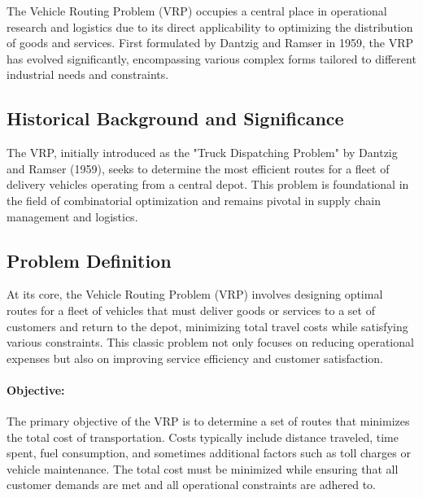 \documentclass[
]{article}
\begin{document}
The Vehicle Routing Problem (VRP) occupies a central place in operational research and logistics due to its direct applicability to optimizing the distribution of goods and services. First formulated by Dantzig and Ramser in 1959, the VRP has evolved significantly, encompassing various complex forms tailored to different industrial needs and constraints.

\subsection{Historical Background and Significance}
The VRP, initially introduced as the "Truck Dispatching Problem" by Dantzig and Ramser (1959), seeks to determine the most efficient routes for a fleet of delivery vehicles operating from a central depot. This problem is foundational in the field of combinatorial optimization and remains pivotal in supply chain management and logistics.

\subsection{Problem Definition}

At its core, the Vehicle Routing Problem (VRP) involves designing optimal routes for a fleet of vehicles that must deliver goods or services to a set of customers and return to the depot, minimizing total travel costs while satisfying various constraints. This classic problem not only focuses on reducing operational expenses but also on improving service efficiency and customer satisfaction.

\paragraph{Objective:}
The primary objective of the VRP is to determine a set of routes that minimizes the total cost of transportation. Costs typically include distance traveled, time spent, fuel consumption, and sometimes additional factors such as toll charges or vehicle maintenance. The total cost must be minimized while ensuring that all customer demands are met and all operational constraints are adhered to.
\end{document}
